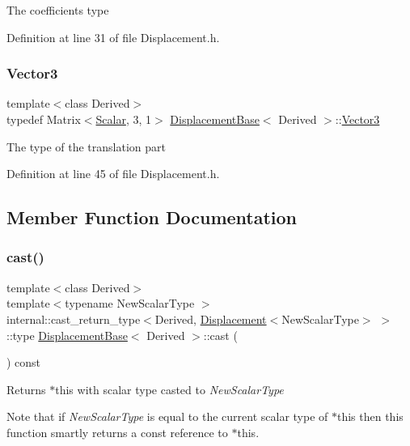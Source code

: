 The coefficients type 

Definition at line 31 of file Displacement.\+h.

\hypertarget{class_displacement_base_a0b5e3b97de6478fd98bf6aec9730d4c4}{}\label{class_displacement_base_a0b5e3b97de6478fd98bf6aec9730d4c4} 
\subsubsection{\texorpdfstring{Vector3}{Vector3}}
{\footnotesize\ttfamily template$<$class Derived$>$ \\
typedef Matrix$<$\hyperlink{class_displacement_base_a978caf313131fd9d221a856a2e4a80ad}{Scalar}, 3, 1$>$ \hyperlink{class_displacement_base}{Displacement\+Base}$<$ Derived $>$\+::\hyperlink{class_displacement_base_a0b5e3b97de6478fd98bf6aec9730d4c4}{Vector3}}

The type of the translation part 

Definition at line 45 of file Displacement.\+h.



\subsection{Member Function Documentation}
\hypertarget{class_displacement_base_a75e8a8cccb491a6b73ef6b2e0dd7f5db}{}\label{class_displacement_base_a75e8a8cccb491a6b73ef6b2e0dd7f5db} 
\subsubsection{\texorpdfstring{cast()}{cast()}}
{\footnotesize\ttfamily template$<$class Derived$>$ \\
template$<$typename New\+Scalar\+Type $>$ \\
internal\+::cast\+\_\+return\+\_\+type$<$Derived, \hyperlink{class_displacement}{Displacement}$<$New\+Scalar\+Type$>$ $>$\+::type \hyperlink{class_displacement_base}{Displacement\+Base}$<$ Derived $>$\+::cast (\begin{DoxyParamCaption}{ }\end{DoxyParamCaption}) const\hspace{0.3cm}{\ttfamily [inline]}}

\begin{DoxyReturn}{Returns}
{\ttfamily $\ast$this} with scalar type casted to {\itshape New\+Scalar\+Type} 
\end{DoxyReturn}
Note that if {\itshape New\+Scalar\+Type} is equal to the current scalar type of {\ttfamily $\ast$this} then this function smartly returns a const reference to {\ttfamily $\ast$this}. 

